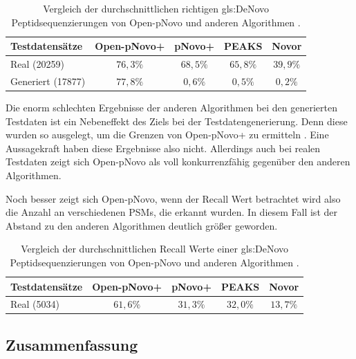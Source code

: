 \documentclass[a4paper, 12pt]{article}
\newcommand{\dashAndSpace}{\textendash \space}
\begin{document}
\begin{table}[H]
    \centering
    \begin{tabular}{l|c|c|c|c}
        \toprule
        \textbf{Testdatensätze} & \textbf{Open-pNovo+} & \textbf{pNovo+} & \textbf{PEAKS} & \textbf{Novor} \\
        \midrule
        Real (20259) & $76,3 \%$ & $68,5 \%$ & $65,8 \%$ & $39,9 \%$ \\
        Generiert (17877) & $77,8 \%$ & $0,6 \%$ & $0,5 \%$ & $0,2 \%$ \\
        \bottomrule
    \end{tabular}
    \newline
    \caption{Vergleich der durchschnittlichen richtigen \gls{gls:DeNovo} Peptidsequenzierungen von Open-pNovo und anderen Algorithmen \cite[650]{OpenPNovo}.}
    \label{tab:OpenPNovoResults}
\end{table}

Die enorm schlechten Ergebnisse der anderen Algorithmen bei den generierten Testdaten ist ein Nebeneffekt des Ziels bei der Testdatengenerierung. Denn diese wurden so ausgelegt, um die Grenzen von Open-pNovo+ zu ermitteln \cite[649]{OpenPNovo}. Eine Aussagekraft haben diese Ergebnisse also nicht. Allerdings auch bei realen Testdaten zeigt sich Open-pNovo als voll konkurrenzfähig gegenüber den anderen Algorithmen.

Noch besser zeigt sich Open-pNovo, wenn der Recall Wert betrachtet wird \dashAndSpace also die Anzahl an verschiedenen PSMs, die erkannt wurden. In diesem Fall ist der Abstand zu den anderen Algorithmen deutlich größer geworden.

\begin{table}[H]
    \centering
    \begin{tabular}{l|c|c|c|c}
        \toprule
        \textbf{Testdatensätze} & \textbf{Open-pNovo+} & \textbf{pNovo+} & \textbf{PEAKS} & \textbf{Novor} \\
        \midrule
        Real (5034) & $61,6 \%$ & $31,3 \%$ & $32,0 \%$ & $13,7 \%$ \\
        \bottomrule
    \end{tabular}
    \newline
    \caption{Vergleich der durchschnittlichen Recall Werte einer \gls{gls:DeNovo} Peptidsequenzierungen von Open-pNovo und anderen Algorithmen \cite[650]{OpenPNovo}.}
    \label{tab:OpenPNovoResultsRecall}
\end{table}

\subsection{Zusammenfassung}
\end{document}
